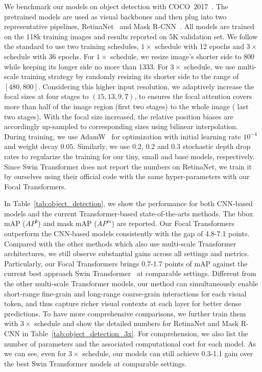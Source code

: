 \documentclass{article}
\begin{document}
We benchmark our models on object detection with COCO~2017~\cite{lin2014microsoft}. The pretrained models are used as visual backbones and then plug into two representative pipelines, RetinaNet~\cite{lin2017focal} and Mask R-CNN~\cite{he2017mask}. All models are trained on the 118k training images and results reported on 5K validation set. We follow the standard to use two training schedules, $1\times$ schedule with 12 epochs and $3\times$ schedule with 36 epochs. For $1\times$ schedule, we resize image's shorter side to $800$ while keeping its longer side no more than 1333. For $3\times$  schedule, we use multi-scale training strategy by randomly resizing its shorter side to the range of $[480,800]$. Considering this higher input resolution, we adaptively increase the focal sizes at four stages to $(15,13,9,7)$, to ensures the focal attention covers more than half of the image region (first two stages) to the whole image ( last two stages). With the focal size increased, the relative position biases are accordingly up-sampled to corresponding sizes using bilinear interpolation. During training, we use AdamW~\cite{loshchilov2017decoupled} for optimization with initial learning rate $10^{-4}$ and weight decay $0.05$. Similarly, we use 0.2, 0.2 and 0.3 stochastic depth drop rates to regularize the training for our tiny, small and base models, respectively. Since Swin Transformer does not report the numbers on RetinaNet, we train it by ourselves using their official code with the same hyper-parameters with our Focal Transformers. 


In Table~\ref{tab:object_detection}, we show the performance for both CNN-based models and the current Transformer-based state-of-the-arts methods. The bbox mAP ($AP^b$) and mask mAP ($AP^m$) are reported. Our Focal Transformers outperform the CNN-based models consistently with the gap of 4.8-7.1 points. Compared with the other methods which also use multi-scale Transformer architectures, we still observe substantial gains across all settings and metrics. Particularly, our Focal Transformers brings 0.7-1.7 points of mAP against the current best approach Swin Transformer~\cite{liu2021swin} at comparable settings. Different from the other multi-scale Transformer models, our method can simultaneously enable short-range fine-grain and long-range coarse-grain interactions for each visual token, and thus capture richer visual contexts at each layer for better dense predictions. To have more comprehensive comparisons, we further train them with  $3\times$  schedule and show the detailed numbers for RetinaNet and Mask R-CNN in Table~\ref{tab:object_detection_3x}. For comprehension, we also list the number of parameters and the associated computational cost for each model. As we can see, even for  $3\times$  schedule, our models can still achieve 0.3-1.1 gain over the best Swin Transformer models at comparable settings.
\end{document}

